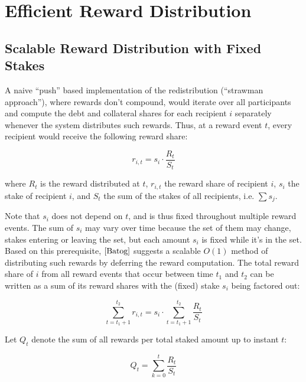 \documentclass[reqno]{article}
\begin{document}
\section{Efficient Reward Distribution}

\subsection{Scalable Reward Distribution with Fixed Stakes} \label{sec:strawman}

A naive “push” based implementation of the redistribution (“strawman approach”), where rewards don’t compound, would iterate over all participants and compute the debt and collateral shares  for each recipient $i$ separately whenever the system distributes such rewards. Thus, at a reward event $t$, every recipient would receive the following reward share:

\begin{equation} 
    r_{i,t}=s_i \cdot \frac{R_t}{S_t}
\end{equation}

where $R_t$ is the reward distributed at $t$, $r_{i,t}$ the reward share of recipient $i$, $s_i$ the stake of recipient $i$, and $S_t$ the sum of the stakes of all recipients, i.e. $\sum s_j$.

Note that $s_i$ does not depend on $t$, and is thus fixed throughout multiple reward events. The sum of $s_i$ may vary over time because the set of them may change, stakes entering or leaving the set, but each amount $s_i$ is fixed while it’s in the set. \\

Based on this prerequisite, $\cite{Batog}$ suggests a scalable $O(1)$ method of distributing such rewards by deferring the reward computation. The total reward share of $i$ from all reward events that occur between time $t_1$ and $t_2$ can be written as a sum of its reward shares with the (fixed) stake $s_i$ being factored out:

\begin{equation}
    \sum\limits_{t=t_1+1}^{t_2} r_{i,t} = s_i \cdot \sum\limits_{t=t_1+1}^{t_2}\frac{R_t}{S_t}
\end{equation}

Let $Q_t$ denote the sum of all rewards per total staked amount up to instant $t$:

\begin{equation}
   Q_t = \sum\limits_{k=0}^{t}\frac{R_t}{S_t}
\end{equation}
\end{document}
